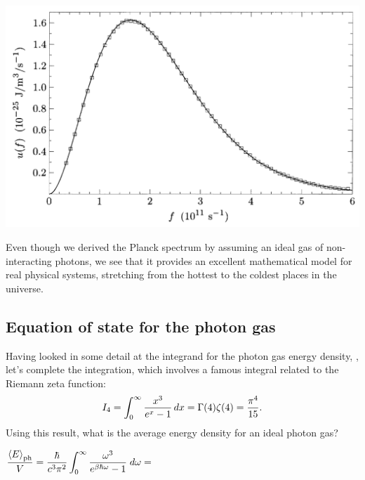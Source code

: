 \begin{center}\includegraphics[width=\textwidth]{figs/unit08_COBE.pdf}\end{center}

\begin{shaded}
  Even though we derived the Planck spectrum by assuming an ideal gas of non-interacting photons, we see that it provides an excellent mathematical model for real physical systems, stretching from the hottest to the coldest places in the universe.
\end{shaded}



\subsection{\label{sec:photon_eos}Equation of state for the photon gas}
Having looked in some detail at the integrand for the photon gas energy density, , let's complete the integration, which involves a famous integral related to the Riemann zeta function:
\begin{equation*}
  I_4 = \int_0^{\infty} \frac{x^3}{e^x - 1} \mathop{dx} = \Gamma(4) \zeta(4) = \frac{\pi^4}{15}.
\end{equation*}
Using this result, what is the average energy density for an ideal photon gas?
\begin{mdframed}
  $\displaystyle \frac{\left\langle E \right\rangle_{\text{ph}}}{V} = \frac{\hbar}{c^3 \pi^2} \int_0^{\infty} \frac{\omega^3}{e^{\beta \hbar \omega} - 1} \; d\omega = $ \\[120 pt] %
\end{mdframed}


